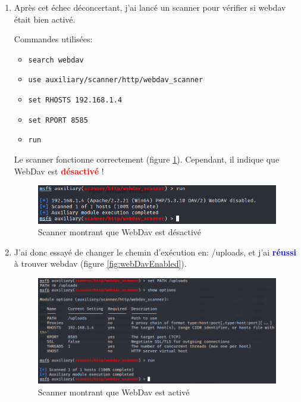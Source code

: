 \documentclass[a4paper]{article}
\begin{document}
\begin{enumerate}
    \item Après cet échec déconcertant, j'ai lancé un scanner pour vérifier si webdav était bien activé.
    \begin{example}
        Commandes utilisées:
        \begin{itemize}
            \item \texttt{\footnotesize search webdav}
            \item \texttt{\footnotesize use auxiliary/scanner/http/webdav\_scanner}
            \item \texttt{\footnotesize set RHOSTS 192.168.1.4}
            \item \texttt{\footnotesize set RPORT 8585}
            \item \texttt{\footnotesize run}
        \end{itemize}
        Le scanner fonctionne correctement (figure \ref{fig:webDavDisabled}). Cependant, il indique que WebDav est \textcolor{red}{\textbf{désactivé}} !
    \end{example}
    \begin{figure}[H]
        \centering
        \includegraphics[width=0.90\linewidth]{images/webdav-disabled.PNG}
        \caption{Scanner montrant que WebDav est désactivé}
        \label{fig:webDavDisabled}
    \end{figure}
    \item J'ai donc essayé de changer le chemin d'exécution en: /uploads, et j'ai \textcolor{blue}{\textbf{réussi}} à trouver webdav (figure \ref{fig:webDavEnabled}).
    \begin{figure}[H]
        \centering
        \includegraphics[width=0.95\linewidth]{images/webdav-enabled.PNG}
        \caption{Scanner montrant que WebDav est activé}

\end{figure}
\end{enumerate}
\end{document}
